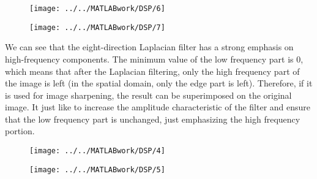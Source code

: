 \documentclass[12pt,a4paper]{article}
\begin{document}
\begin{figure}[h]
	\begin{center}
		\texttt{[image: ../../MATLABwork/DSP/6]}
	\end{center}
\end{figure}
\begin{figure}[ht]
	\begin{center}
		\texttt{[image: ../../MATLABwork/DSP/7]}
	\end{center}
\end{figure}
\newpage
We can see that the eight-direction Laplacian filter has a strong emphasis on high-frequency components. The minimum value of the low frequency part is 0, which means that after the Laplacian filtering, only the high frequency part of the image is left (in the spatial domain, only the edge part is left). Therefore, if it is used for image sharpening, the result can be superimposed on the original image. It just like to increase the amplitude characteristic of the filter and ensure that the low frequency part is unchanged, just emphasizing the high frequency portion.
\newpage
\begin{figure}[h]
	\begin{center}
		\texttt{[image: ../../MATLABwork/DSP/4]}
	\end{center}
\end{figure}
\begin{figure}[h]
	\begin{center}
		\texttt{[image: ../../MATLABwork/DSP/5]}
	\end{center}
\end{figure}
\end{document}

